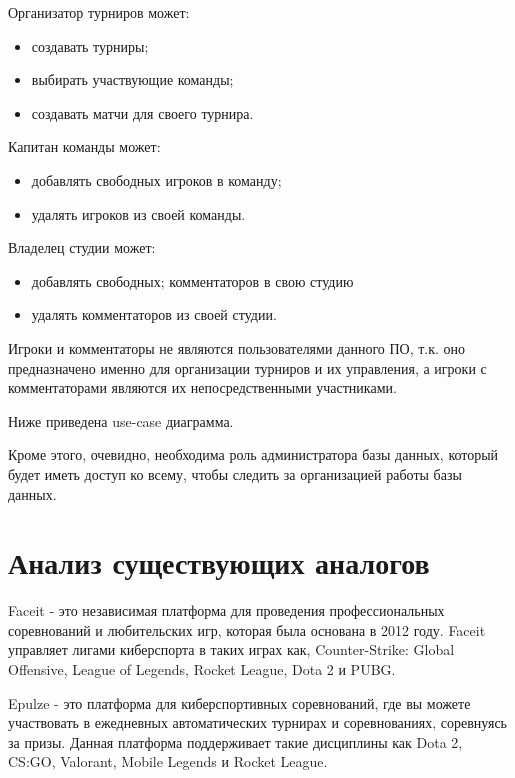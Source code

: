 Организатор турниров может:
\begin{itemize}
	\item создавать турниры;
	\item выбирать участвующие команды;
	\item создавать матчи для своего турнира.
\end{itemize}

Капитан команды может:
\begin{itemize}
	\item добавлять свободных игроков в команду;
	\item удалять игроков из своей команды.
\end{itemize}

Владелец студии может:
\begin{itemize}
	\item добавлять свободных; комментаторов в свою студию
	\item удалять комментаторов из своей студии.
\end{itemize}

Игроки и комментаторы не являются пользователями данного ПО, т.к. оно предназначено именно для организации турниров и их управления, а игроки с комментаторами являются их непосредственными участниками.

\newpage
Ниже приведена use-case диаграмма.

Кроме этого, очевидно, необходима роль администратора базы данных, который будет иметь доступ ко всему, чтобы следить за организацией работы базы данных.


\section{Анализ существующих аналогов}


Faceit - это независимая платформа для проведения профессиональных соревнований и любительских игр, которая была основана в 2012 году. Faceit управляет лигами киберспорта в таких играх как, Counter-Strike: Global Offensive, League of Legends, Rocket League, Dota 2 и PUBG.


Epulze - это платформа для киберспортивных соревнований, где вы можете участвовать в ежедневных автоматических турнирах и соревнованиях, соревнуясь за призы. Данная платформа поддерживает такие дисциплины как Dota 2, CS:GO, Valorant, Mobile Legends и Rocket League.

